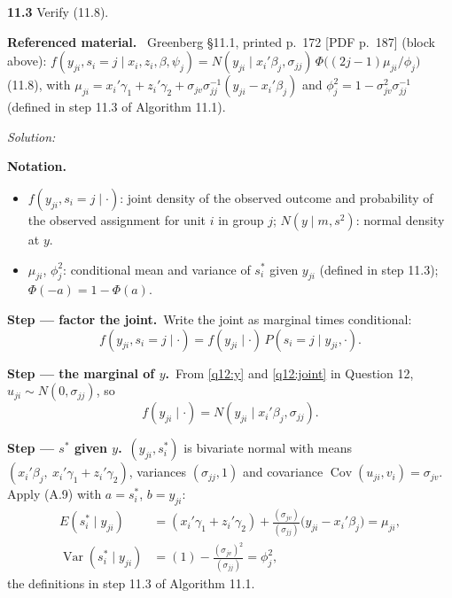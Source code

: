 \documentclass[11pt,a4paper]{article}
\newif\ifsolucoes
\newcommand{\espacoresol}{4.5cm}   %
\newenvironment{refmaterial}{\par\smallskip\noindent\begingroup\small\textbf{Referenced material.}~}{\endgroup\par\smallskip}
\newenvironment{notacao}{\par\smallskip\noindent\textbf{Notation.}\begin{itemize}[leftmargin=1.4em,topsep=1pt,itemsep=0pt]\small}{\end{itemize}}
\newcommand{\resolespaco}{\ifsolucoes\else\par\textit{Solution:}\vspace{\espacoresol}\par\fi}
\newcommand{\passo}[2]{\par\smallskip\noindent\textbf{Step --- #1.}~#2}
\begin{document}
\noindent\textbf{11.3} Verify (11.8).
\begin{refmaterial}
Greenberg \S11.1, printed p.~172 [PDF p.~187] (block above):
$f(y_{ji},s_i=j\mid x_i,z_i,\beta,\psi_j)=N(y_{ji}\mid x_i'\beta_j,\sigma_{jj})\,\Phi\big((2j-1)\mu_{ji}/\phi_j\big)$
(11.8), with $\mu_{ji}=x_i'\gamma_1+z_i'\gamma_2+\sigma_{jv}\sigma_{jj}^{-1}(y_{ji}-x_i'\beta_j)$ and
$\phi_j^2=1-\sigma_{jv}^2\sigma_{jj}^{-1}$ (defined in step 11.3 of Algorithm 11.1).
\end{refmaterial}
\resolespaco
\begin{sol}
\begin{notacao}
\item $f(y_{ji},s_i=j\mid\cdot)$: joint density of the observed outcome and probability of the observed
assignment for unit $i$ in group $j$; $N(y\mid m,s^2)$: normal density at $y$.
\item $\mu_{ji}$, $\phi_j^2$: conditional mean and variance of $s_i^*$ given $y_{ji}$ (defined in step 11.3);
$\Phi(-a)=1-\Phi(a)$.
\end{notacao}

\passo{factor the joint}{Write the joint as marginal times conditional:
\begin{equation}
f(y_{ji},s_i=j\mid\cdot)=f(y_{ji}\mid\cdot)\,P(s_i=j\mid y_{ji},\cdot).\label{q14:fac}
\end{equation}}

\passo{the marginal of $y$}{From \eqref{q12:y} and \eqref{q12:joint} in Question 12,
$u_{ji}\sim N(0,\sigma_{jj})$, so
\begin{equation}
f(y_{ji}\mid\cdot)=N(y_{ji}\mid x_i'\beta_j,\sigma_{jj}).\label{q14:marg}
\end{equation}}

\passo{$s^*$ given $y$}{$(y_{ji},s_i^*)$ is bivariate normal with means $(x_i'\beta_j,\ x_i'\gamma_1+z_i'\gamma_2)$,
variances $(\sigma_{jj},1)$ and covariance $\operatorname{Cov}(u_{ji},v_i)=\sigma_{jv}$. Apply (A.9) with
$a=s_i^*$, $b=y_{ji}$:
\begin{align}
E(s_i^*\mid y_{ji})&=(x_i'\gamma_1+z_i'\gamma_2)+\frac{(\sigma_{jv})}{(\sigma_{jj})}\big(y_{ji}-x_i'\beta_j\big)=\mu_{ji},\label{q14:mu}\\
\operatorname{Var}(s_i^*\mid y_{ji})&=(1)-\frac{(\sigma_{jv})^2}{(\sigma_{jj})}=\phi_j^2,\label{q14:phi}
\end{align}
the definitions in step 11.3 of Algorithm 11.1.}


\end{sol}
\end{document}
